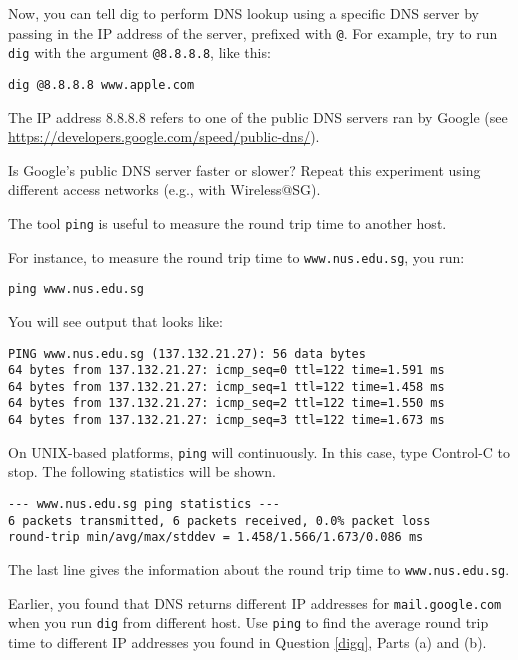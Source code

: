 \documentclass[a4paper,11pt]{exam}
\begin{document}
\begin{questions}
\begin{parts}
Now, you can tell dig to perform DNS lookup using a specific DNS server by passing in the IP address of the server, prefixed with \texttt{@}.  For example, try to run \texttt{dig} with the argument \texttt{@8.8.8.8}, like this:

\texttt{dig @8.8.8.8 www.apple.com}

The IP address 8.8.8.8 refers to one of the public DNS servers ran by Google (see \url{https://developers.google.com/speed/public-dns/}).

Is Google's public DNS server faster or slower?  Repeat this experiment using different access networks (e.g., with Wireless@SG).

\end{parts}


The tool \texttt{ping} is useful to measure the round trip time to another host.

For instance, to measure the round trip time to \texttt{www.nus.edu.sg}, you run:

\texttt{ping www.nus.edu.sg}

You will see output that looks like:

\begin{verbatim}
PING www.nus.edu.sg (137.132.21.27): 56 data bytes
64 bytes from 137.132.21.27: icmp_seq=0 ttl=122 time=1.591 ms
64 bytes from 137.132.21.27: icmp_seq=1 ttl=122 time=1.458 ms
64 bytes from 137.132.21.27: icmp_seq=2 ttl=122 time=1.550 ms
64 bytes from 137.132.21.27: icmp_seq=3 ttl=122 time=1.673 ms
\end{verbatim}

On UNIX-based platforms, \texttt{ping} will continuously.  In this case, type Control-C to stop.  The following statistics will
be shown.

\begin{verbatim}
--- www.nus.edu.sg ping statistics ---
6 packets transmitted, 6 packets received, 0.0% packet loss
round-trip min/avg/max/stddev = 1.458/1.566/1.673/0.086 ms
\end{verbatim}

The last line gives the information about the round trip time to \texttt{www.nus.edu.sg}.

Earlier, you found that DNS returns different IP addresses for \texttt{mail.google.com} when you run \texttt{dig} from different host.  Use \texttt{ping} to find the average round trip time to different IP addresses you found in Question \ref{digq}, Parts (a) and (b).


\end{questions}
\end{document}
